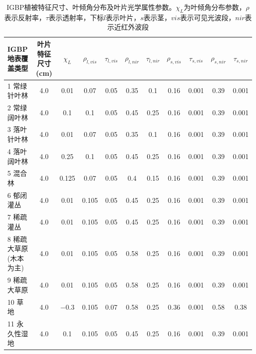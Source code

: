 \begin{landscape}
\begin{table}[htbp]    
    \centering
    \caption[IGBP植被特征尺寸、叶倾角分布及叶片光学属性参数]{IGBP植被特征尺寸、叶倾角分布及叶片光学属性参数。$\chi_L$为叶倾角分布参数，$\rho$表示反射率，$\tau$表示透射率，下标$l$表示叶片，$s$表示茎，$vis$表示可见光波段，$nir$表示近红外波段}
    \label{tab:IGBP植被特征尺寸叶倾角分布及叶片光学属性参数1}
        \begin{tabular}{@{}lcccccccccc@{}}
        \toprule
        IGBP地表覆盖类型     & 叶片特征尺寸(cm) & $\chi_L$ &$\rho_{l, vis}$ & $\tau_{l, vis}$  &$\rho_{l, nir}$ &$\tau_{l, nir}$ & $\rho_{s, vis}$ &$\tau_{s, vis}$ &$\rho_{s, nir}$ &$\tau_{s, nir}$\\ \midrule
        1 常绿针叶林      & 4.0        & \num {0.01  }& 0.07  & 0.05 & 0.35 & 0.1  & 0.16 & 0.001 & 0.39 & 0.001 \\
        2 常绿阔叶林       & 4.0        &\num { 0.1  } & 0.1   & 0.05 & 0.45 & 0.25 & 0.16 & 0.001 & 0.39 & 0.001 \\
        3 落叶针叶林       & 4.0        &\num { 0.01 } & 0.07  & 0.05 & 0.35 & 0.1  & 0.16 & 0.001 & 0.39 & 0.001 \\
        4 落叶阔叶林       & 4.0        &\num { 0.25 } & 0.1   & 0.05 & 0.45 & 0.25 & 0.16 & 0.001 & 0.39 & 0.001 \\
        5 混合林         & 4.0        &\num { 0.125} & 0.07  & 0.05 & 0.4  & 0.15 & 0.16 & 0.001 & 0.39 & 0.001 \\
        6 郁闭灌丛        & 4.0        &\num { 0.01 } & 0.105 & 0.05 & 0.45 & 0.25 & 0.16 & 0.001 & 0.39 & 0.001 \\
        7 稀疏灌丛        & 4.0        &\num { 0.01 } & 0.105 & 0.05 & 0.45 & 0.25 & 0.16 & 0.001 & 0.39 & 0.001 \\
        8 稀疏大草原(木本为主) & 4.0        &\num { 0.01 } & 0.105 & 0.05 & 0.58 & 0.25 & 0.16 & 0.001 & 0.39 & 0.001 \\
        9 稀疏大草原       & 4.0        &\num {  0.01 } & 0.105 & 0.05 & 0.58 & 0.25 & 0.16 & 0.001 & 0.39 & 0.001 \\
        10 草地          & 4.0        & \num{ -0.3}  & 0.105 & 0.07 & 0.58 & 0.25 & 0.36 & 0.001 & 0.58 & 0.38  \\
        11 永久性湿地    & 4.0        & \num {0.1 }  & 0.105 & 0.05 & 0.45 & 0.25 & 0.16 & 0.001 & 0.39 & 0.001 \\ %

\end{tabular}
\end{table}
\end{landscape}
